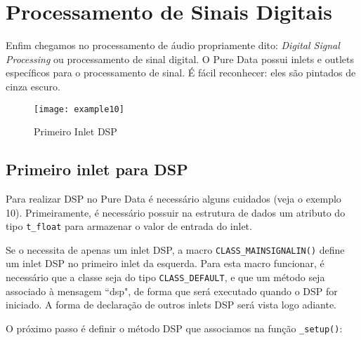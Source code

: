 
\chapter{Processamento de Sinais Digitais}


Enfim chegamos no processamento de áudio propriamente dito: \emph{Digital
Signal Processing} ou processamento de sinal digital. O Pure Data possui
inlets e outlets específicos para o processamento de sinal. É fácil
reconhecer: eles são pintados de cinza escuro.

\begin{figure}[h!]
\centering
\texttt{[image: example10]}
\caption{Primeiro Inlet DSP}
\end{figure}

\section{Primeiro inlet para DSP}

Para realizar DSP no Pure Data é necessário alguns cuidados (veja o exemplo
10). Primeiramente, é necessário possuir na estrutura de dados um atributo do
tipo \texttt{t\_float} para armazenar o valor de entrada do inlet.



Se o \external necessita de apenas um inlet DSP, a macro
\texttt{CLASS\_MAINSIGNALIN()} define um inlet DSP no primeiro inlet da
esquerda. Para esta macro funcionar, é necessário que a classe seja do tipo
\texttt{CLASS\_DEFAULT}, e que um método seja associado à mensagem ``dsp", de
forma que será executado quando o DSP for iniciado. A forma de declaração de
outros inlets DSP será vista logo adiante.


 
O próximo passo é definir o método DSP que associamos na função
\texttt{\_setup()}:



